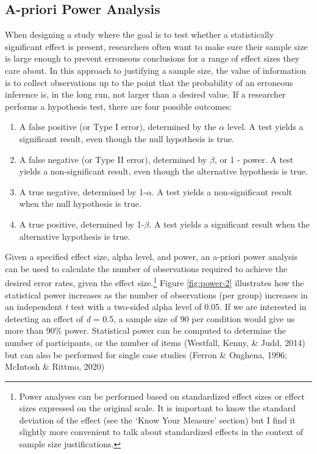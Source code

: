 \documentclass[
  english,
  ,jou,floatsintext]{apa6}
\providecommand{\tightlist}{%
  \setlength{\itemsep}{0pt}\setlength{\parskip}{0pt}}
\begin{document}
\hypertarget{a-priori-power-analysis}{%
\subsection{A-priori Power Analysis}\label{a-priori-power-analysis}}

When designing a study where the goal is to test whether a statistically significant effect is present, researchers often want to make sure their sample size is large enough to prevent erroneous conclusions for a range of effect sizes they care about. In this approach to justifying a sample size, the value of information is to collect observations up to the point that the probability of an erroneous inference is, in the long run, not larger than a desired value. If a researcher performs a hypothesis test, there are four possible outcomes:

\begin{enumerate}
\def\labelenumi{\arabic{enumi}.}
\tightlist
\item
  A false positive (or Type I error), determined by the \(\alpha\) level. A test yields a significant result, even though the null hypothesis is true.
\item
  A false negative (or Type II error), determined by \(\beta\), or 1 - power. A test yields a non-significant result, even though the alternative hypothesis is true.
\item
  A true negative, determined by 1-\(\alpha\). A test yields a non-significant result when the null hypothesis is true.
\item
  A true positive, determined by 1-\(\beta\). A test yields a significant result when the alternative hypothesis is true.
\end{enumerate}

Given a specified effect size, alpha level, and power, an a-priori power analysis can be used to calculate the number of observations required to achieve the desired error rates, given the effect size.\footnote{Power analyses can be performed based on standardized effect sizes or effect sizes expressed on the original scale. It is important to know the standard deviation of the effect (see the `Know Your Measure' section) but I find it slightly more convenient to talk about standardized effects in the context of sample size justifications.} Figure \ref{fig:power-2} illustrates how the statistical power increases as the number of observations (per group) increases in an independent \emph{t} test with a two-sided alpha level of 0.05. If we are interested in detecting an effect of \emph{d} = 0.5, a sample size of 90 per condition would give us more than 90\% power. Statistical power can be computed to determine the number of participants, or the number of items (Westfall, Kenny, \& Judd, 2014) but can also be performed for single case studies (Ferron \& Onghena, 1996; McIntosh \& Rittmo, 2020)
\end{document}
